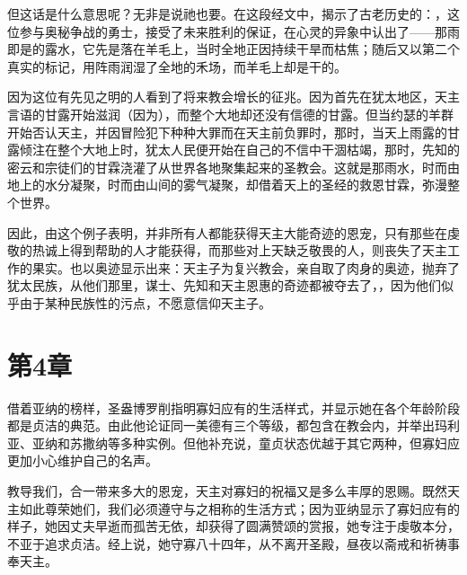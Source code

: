 但这话是什么意思呢？无非是说祂也要。在这段经文中，揭示了古老历史的：，这位参与奥秘争战的勇士，接受了未来胜利的保证，在心灵的异象中认出了——那雨即是的露水，它先是落在羊毛上，当时全地正因持续干旱而枯焦；随后又以第二个真实的标记，用阵雨润湿了全地的禾场，而羊毛上却是干的。\par

因为这位有先见之明的人看到了将来教会增长的征兆。因为首先在犹太地区，天主言语的甘露开始滋润（因为），而整个大地却还没有信德的甘露。但当约瑟的羊群开始否认天主，并因冒险犯下种种大罪而在天主前负罪时，那时，当天上雨露的甘露倾注在整个大地上时，犹太人民便开始在自己的不信中干涸枯竭，那时，先知的密云和宗徒们的甘霖浇灌了从世界各地聚集起来的圣教会。这就是那雨水，时而由地上的水分凝聚，时而由山间的雾气凝聚，却借着天上的圣经的救恩甘霖，弥漫整个世界。\par

因此，由这个例子表明，并非所有人都能获得天主大能奇迹的恩宠，只有那些在虔敬的热诚上得到帮助的人才能获得，而那些对上天缺乏敬畏的人，则丧失了天主工作的果实。也以奥迹显示出来：天主子为复兴教会，亲自取了肉身的奥迹，抛弃了犹太民族，从他们那里，谋士、先知和天主恩惠的奇迹都被夺去了，，因为他们似乎由于某种民族性的污点，不愿意信仰天主子。\par


\section{第4章}

借着亚纳的榜样，圣盎博罗削指明寡妇应有的生活样式，并显示她在各个年龄阶段都是贞洁的典范。由此他论证同一美德有三个等级，都包含在教会内，并举出玛利亚、亚纳和苏撒纳等多种实例。但他补充说，童贞状态优越于其它两种，但寡妇应更加小心维护自己的名声。\par

教导我们，合一带来多大的恩宠，天主对寡妇的祝福又是多么丰厚的恩赐。既然天主如此尊荣她们，我们必须遵守与之相称的生活方式；因为亚纳显示了寡妇应有的样子，她因丈夫早逝而孤苦无依，却获得了圆满赞颂的赏报，她专注于虔敬本分，不亚于追求贞洁。经上说，她守寡八十四年，从不离开圣殿，昼夜以斋戒和祈祷事奉天主。\par

